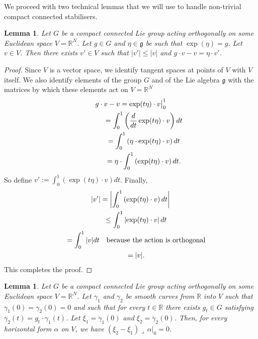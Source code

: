 \documentclass[11pt]{article}
\numberwithin{equation}{section}
\newtheorem{Lemma}[Theorem]{Lemma}
\newcommand{\RR}{{\mathbb{R}}} %
\newcommand{\g}{{\mathfrak{g}}} %
\newcommand{\hook}{{\lrcorner\,}} %
\begin{document}

We proceed with two technical lemmas that we will use
to handle non-trivial compact connected stabilisers.

\begin{Lemma}\label{l:techn1}
Let $G$ be a compact connected Lie group acting orthogonally
on some Euclidean space $V = \RR^N$.
Let $g \in G$ and $\eta \in \g$ be such that $\exp(\eta) = g$.
Let $v \in V$. Then there exists $v' \in V$
such that $|v'| \leq |v|$ and $g \cdot v - v = \eta \cdot v'$.
\end{Lemma}

\begin{proof}
Since $V$ is a vector space, we identify tangent spaces at points of $V$
with $V$ itself.
We also identify elements of the group $G$ and of the Lie algebra $\g$
with the matrices by which these elements act on $V=\RR^N$
\begin{gather*}
 g \cdot v - v = \exp(t\eta) \cdot v \big|_0^1\\
\hphantom{g \cdot v - v}{}
 = \int_0^1 \left( \frac{d}{dt} \exp(t\eta) \cdot v\right) dt\\
\hphantom{g \cdot v - v}{}
 = \int_0^1 \left( \eta \cdot \exp(t\eta) \cdot v\right) dt \\
 \hphantom{g \cdot v - v}{}
 = \eta \cdot \int_0^1 \left( \exp(t\eta) \cdot v \right) dt.
\end{gather*}
So def\/ine $v':=\int_0^1\left(\exp(t\eta)\cdot v\right)dt$. Finally,
\begin{gather*}
 |v'| = \left| \int_0^1 \left( \exp(t\eta) \cdot v \right) dt \right|\\
\hphantom{|v'|}{}
 \leq \int_0^1 \left| \exp(t\eta) \cdot v\right| dt\\
 \hphantom{|v'|}{}
 = \int_0^1 |v| dt \quad \text{because the action is orthogonal} \\
\hphantom{|v'|}{} = |v|.
\end{gather*}
This completes the proof.
\end{proof}

\begin{Lemma}\label{l:techn2}
Let $G$ be a compact connected Lie group acting orthogonally
on some Euclidean space $V = \RR^N$.
Let $\gamma_1$ and $\gamma_2$ be smooth curves from $\RR$ into $V$
such that $ \gamma_1(0) = \gamma_2(0) = 0 $
and such that for every $t \in \RR$ there exists $g_t \in G$
satisfying $\gamma_2(t) = g_t \cdot \gamma_1(t)$.
Let $\xi_1 = \dot{\gamma}_1(0)$ and $\xi_2 = \dot{\gamma}_2(0)$.
Then, for every horizontal form $\alpha$ on $V$,
we have $(\xi_2-\xi_1)\hook\alpha|_0=0$.
\end{Lemma}
\end{document}
